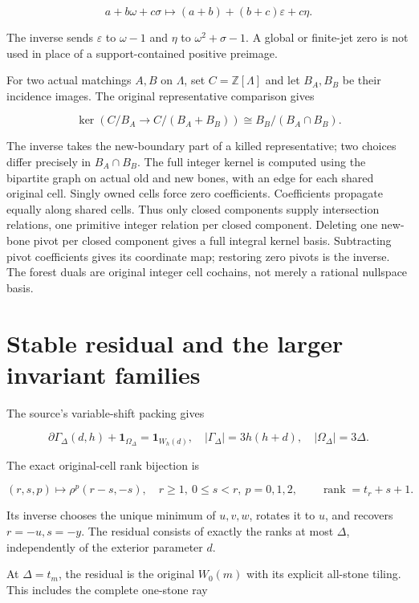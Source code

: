 \documentclass[
  10pt,
]{scrreprt}
\begin{document}
\[a+b\omega+c\sigma\mapsto(a+b)+(b+c)\varepsilon+c\eta.\]

The inverse sends \(\varepsilon\) to \(\omega-1\) and \(\eta\) to
\(\omega^2+\sigma-1\). A global or finite-jet zero is not used in place
of a support-contained positive preimage.

For two actual matchings \(A,B\) on \(\Lambda\), set
\(C=\mathbb Z[\Lambda]\) and let \(B_A,B_B\) be their incidence images.
The original representative comparison gives

\[\ker(C/B_A\to C/(B_A+B_B))\cong B_B/(B_A\cap B_B).\]

The inverse takes the new-boundary part of a killed representative; two
choices differ precisely in \(B_A\cap B_B\). The full integer kernel is
computed using the bipartite graph on actual old and new bones, with an
edge for each shared original cell. Singly owned cells force zero
coefficients. Coefficients propagate equally along shared cells. Thus
only closed components supply intersection relations, one primitive
integer relation per closed component. Deleting one new-bone pivot per
closed component gives a full integral kernel basis. Subtracting pivot
coefficients gives its coordinate map; restoring zero pivots is the
inverse. The forest duals are original integer cell cochains, not merely
a rational nullspace basis.

\section{Stable residual and the larger invariant
families}\label{stable-residual-and-the-larger-invariant-families}

The source's variable-shift packing gives

\[\partial\Gamma_\Delta(d,h)+\mathbf1_{\Omega_\Delta}=\mathbf1_{W_h(d)},
\quad|\Gamma_\Delta|=3h(h+d),\quad|\Omega_\Delta|=3\Delta.\]

The exact original-cell rank bijection is

\[(r,s,p)\mapsto\rho^p(r-s,-s),\quad r\ge1,\ 0\le s<r,\ p=0,1,2,
\qquad\operatorname{rank}=t_r+s+1.\]

Its inverse chooses the unique minimum of \(u,v,w\), rotates it to
\(u\), and recovers \(r=-u,s=-y\). The residual consists of exactly the
ranks at most \(\Delta\), independently of the exterior parameter \(d\).

At \(\Delta=t_m\), the residual is the original \(W_0(m)\) with its
explicit all-stone tiling. This includes the complete one-stone ray
\end{document}
